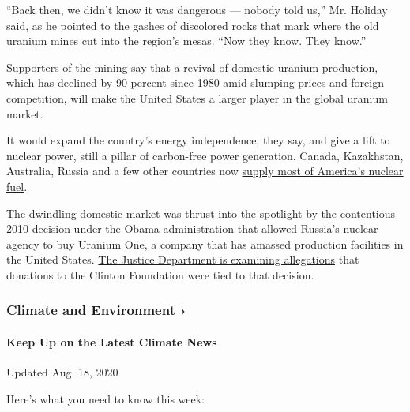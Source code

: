 ``Back then, we didn't know it was dangerous --- nobody told us,'' Mr.
Holiday said, as he pointed to the gashes of discolored rocks that mark
where the old uranium mines cut into the region's mesas. ``Now they
know. They know.''

Supporters of the mining say that a revival of domestic uranium
production, which has
\href{https://www.eia.gov/todayinenergy/detail.php?id=26472}{declined by
90 percent since 1980} amid slumping prices and foreign competition,
will make the United States a larger player in the global uranium
market.

It would expand the country's energy independence, they say, and give a
lift to nuclear power, still a pillar of carbon-free power generation.
Canada, Kazakhstan, Australia, Russia and a few other countries now
\href{https://www.eia.gov/energyexplained/index.cfm?page=nuclear_where}{supply
most of America's nuclear fuel}.

The dwindling domestic market was thrust into the spotlight by the
contentious
\href{https://www.nytimes3xbfgragh.onion/2017/11/14/us/politics/uranium-one-hillary-clinton.html}{2010
decision under the Obama administration} that allowed Russia's nuclear
agency to buy Uranium One, a company that has amassed production
facilities in the United States.
\href{https://www.nytimes3xbfgragh.onion/2017/11/13/us/politics/justice-department-uranium-one-special-counsel.html}{The
Justice Department is examining allegations} that donations to the
Clinton Foundation were tied to that decision.

\href{https://www.nytimes3xbfgragh.onion/section/climate?action=click\&pgtype=Article\&state=default\&region=MAIN_CONTENT_1\&context=storylines_keepup}{}

\hypertarget{climate-and-environment-}{%
\subsubsection{Climate and Environment
›}\label{climate-and-environment-}}

\hypertarget{keep-up-on-the-latest-climate-news}{%
\paragraph{Keep Up on the Latest Climate
News}\label{keep-up-on-the-latest-climate-news}}

Updated Aug. 18, 2020

Here's what you need to know this week:


